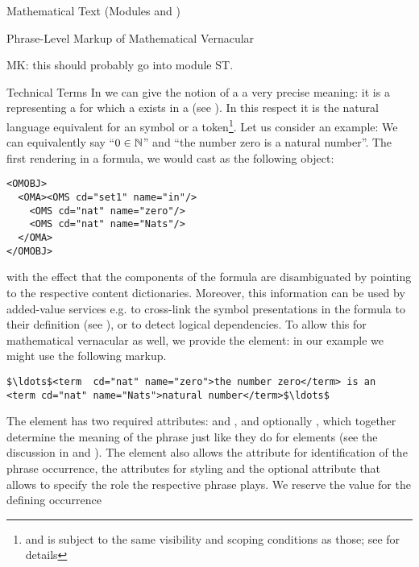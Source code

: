 \begin{tchapter}[id=mtxt,short=Mathematical Text]{Mathematical Text (Modules
  {} and {})}
\begin{tsection}[id=phrases]{Phrase-Level Markup of Mathematical Vernacular}
\begin{oldpart}{MK: this should probably go into module ST.}
\begin{tsubsection}[id=terms]{Technical Terms}
  In {\omdoc} we can give the notion of a {} a very precise
  meaning: it is a {} representing a {} for which a
  {} exists in a {} (see
  {}). In this respect it is the natural language equivalent for
  an {\openmath} symbol or a {\cmathml} token\footnote{and is subject to the same
    visibility and scoping conditions as those; see {} for
    details}. Let us consider an example: We can equivalently say ``$0\in{\mathbb{N}}$'' and ``the
  number zero is a natural number''. The first rendering in a formula, we would cast as
  the following {\openmath} object:
\begin{lstlisting}[language=OpenMath,numbers=none]
<OMOBJ>
  <OMA><OMS cd="set1" name="in"/>
    <OMS cd="nat" name="zero"/>
    <OMS cd="nat" name="Nats"/>
  </OMA>
</OMOBJ>
\end{lstlisting}
  with the effect that the components of the formula are disambiguated by pointing to the
  respective content dictionaries. Moreover, this information can be used by added-value
  services e.g. to cross-link the symbol presentations in the formula to their definition
  (see {}), or to detect logical dependencies. To allow this for
  mathematical vernacular as well, we provide the {} element: in our example
  we might use the following markup.
\begin{lstlisting}[language=OpenMath,numbers=none,mathescape]
$\ldots$<term  cd="nat" name="zero">the number zero</term> is an 
<term cd="nat" name="Nats">natural number</term>$\ldots$
\end{lstlisting}
The {} element has two required attributes: {} and
{}, and optionally {}, which together determine the meaning of the phrase just like
they do for {} elements (see the discussion in
{} and {}). The {} element also
allows the attribute {} for identification of the phrase
occurrence, the {\css} attributes for styling and the optional
{} attribute that allows to specify the role the respective phrase
plays. We reserve the value {} for the defining occurrence

\end{tsubsection}
\end{oldpart}
\end{tsection}
\end{tchapter}
